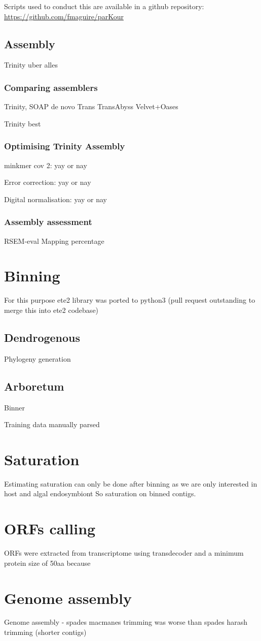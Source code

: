 Scripts used to conduct this are available in a github repository:
\url{https://github.com/fmaguire/parKour}



\subsection{Assembly}

Trinity uber alles

\subsubsection{Comparing assemblers}
Trinity,
SOAP de novo Trans
TransAbyss
Velvet+Oases

Trinity best

\subsubsection{Optimising Trinity Assembly}

minkmer cov 2: yay or nay

Error correction: yay or nay

Digital normalisation: yay or nay

\subsubsection{Assembly assessment}
RSEM-eval
Mapping percentage




\section{Binning}
For this purpose ete2 library was ported to python3 (pull request outstanding to merge this into ete2 codebase)
\subsection{Dendrogenous}
Phylogeny generation

\subsection{Arboretum}
Binner 

Training data manually parsed



\section{Saturation}
Estimating saturation can only be done after binning as we are only interested in host and algal endosymbiont
So saturation on binned contigs.


\section{ORFs calling}

ORFs were extracted from transcriptome using transdecoder and a minimum protein size of 50aa
because




\section{Genome assembly}



Genome assembly - spades macmanes trimming was worse than spades harash trimming (shorter contigs)


